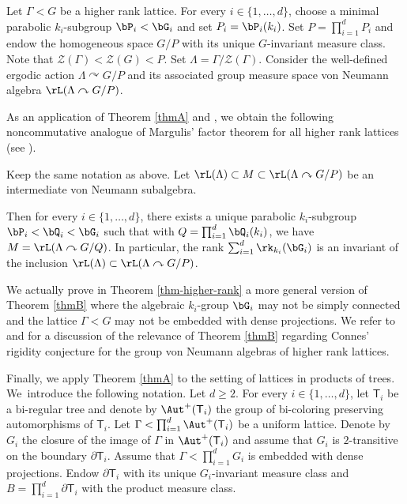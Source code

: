Let $\Gamma < G$ be a higher rank lattice. For every $i \in \{1, \dots, d\}$, choose a minimal parabolic $k_i$-subgroup $\bP_i < \bG_i$ and set $P_i = \bP_i(k_i)$. Set $P = \prod_{i = 1}^d P_i$ and endow the homogeneous space $G/P$ with its unique $G$-invariant measure class. Note that $\mathscr Z(\Gamma) < \mathscr Z(G) < P$. Set $\Lambda = \Gamma/\mathscr Z(\Gamma)$. Consider the well-defined ergodic action $\Lambda \curvearrowright G/P$ and its associated group measure space von Neumann algebra $\rL(\Lambda \curvearrowright G/P)$.

As an application of Theorem \ref{thmA} and \cite[Th.\,D]{BBH21}, we obtain the following noncommutative analogue of Margulis'\! factor theorem for all higher rank lattices (see \cite[Th.\,IV.2.11]{Ma91}).

\begin{letterthm}\label{thmB}
Keep the same notation as above. Let $\rL(\Lambda) \subset M \subset \rL(\Lambda \curvearrowright G/P)$ be an intermediate von Neumann subalgebra.

Then for every $i \in \{1, \dots, d\}$, there exists a unique parabolic $k_i$-subgroup $\bP_i < \bQ_i < \bG_i$ such that with $Q = \prod_{i = 1}^d \bQ_i(k_i)$, we have $M = \rL(\Lambda \curvearrowright G/Q)$. In particular, the rank $\sum_{i = 1}^d \rk_{k_i}(\bG_i)$ is an invariant of the inclusion $\rL(\Lambda) \subset \rL(\Lambda \curvearrowright G/P)$.
\end{letterthm}

We actually prove in Theorem \ref{thm-higher-rank} a more general version of Theorem \ref{thmB} where the algebraic $k_i$-group $\bG_i$ may not be simply connected and the lattice $\Gamma < G$ may not be embedded with dense projections. We refer to \cite[\S 6]{BBH21} and \cite[\S 5]{Ho21} for a discussion of the relevance of Theorem \ref{thmB} regarding Connes'\! rigidity conjecture for the group von Neumann algebras of higher rank lattices.

Finally, we apply Theorem \ref{thmA} to the setting of lattices in products of trees. We~introduce the following notation. Let $d\geq 2$. For every $i \in \{1, \dots, d\}$, let $\mathsf T_i$ be a bi-regular tree and denote by $\Aut^+(\mathsf T_i)$ the group of bi-coloring preserving automorphisms of $\mathsf T_i$. Let $\Gamma < \prod_{i = 1}^d \Aut^+(\mathsf T_i)$ be a uniform lattice. Denote by $G_i$ the closure of the image of $\Gamma$ in $\Aut^+(\mathsf T_i)$ and assume that $G_i$ is $2$-transitive on the boundary $\partial \mathsf T_i$. Assume that $\Gamma < \prod_{i = 1}^d G_i$ is embedded with dense projections. Endow $\partial \mathsf T_i$ with its unique $G_i$-invariant measure class and $B = \prod_{i = 1}^d \partial \mathsf T_i$ with the product measure class.

